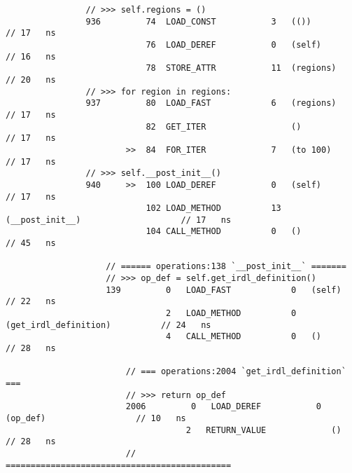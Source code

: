 \begin{code}
\begin{verbatim}
                // >>> self.regions = ()
                936         74  LOAD_CONST           3   (())                               // 17   ns
                            76  LOAD_DEREF           0   (self)                             // 16   ns
                            78  STORE_ATTR           11  (regions)                          // 20   ns
                // >>> for region in regions:
                937         80  LOAD_FAST            6   (regions)                          // 17   ns
                            82  GET_ITER                 ()                                 // 17   ns
                        >>  84  FOR_ITER             7   (to 100)                           // 17   ns
                // >>> self.__post_init__()
                940     >>  100 LOAD_DEREF           0   (self)                             // 17   ns
                            102 LOAD_METHOD          13  (__post_init__)                    // 17   ns
                            104 CALL_METHOD          0   ()                                 // 45   ns

                    // ====== operations:138 `__post_init__` =======
                    // >>> op_def = self.get_irdl_definition()
                    139         0   LOAD_FAST            0   (self)                         // 22   ns
                                2   LOAD_METHOD          0   (get_irdl_definition)          // 24   ns
                                4   CALL_METHOD          0   ()                             // 28   ns

                        // === operations:2004 `get_irdl_definition` ===
                        // >>> return op_def
                        2006         0   LOAD_DEREF           0   (op_def)                  // 10   ns
                                    2   RETURN_VALUE             ()                         // 28   ns
                        // =============================================


\end{verbatim}
\end{code}
